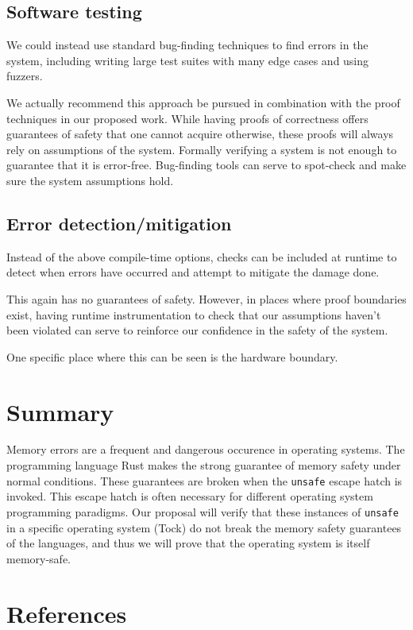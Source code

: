 \documentclass[12pt]{article}
\begin{document}
\subsection{Software testing}
We could instead use standard bug-finding techniques to find errors in the system, including writing large test suites with many edge cases and using fuzzers. 

We actually recommend this approach be pursued in combination with the proof techniques in our proposed work. While having proofs of correctness offers guarantees of safety that one cannot acquire otherwise, these proofs will always rely on assumptions of the system. Formally verifying a system is not enough to guarantee that it is error-free\cite{fonseca2017empirical}. Bug-finding tools can serve to spot-check and make sure the system assumptions hold.
    
\subsection{Error detection/mitigation}
Instead of the above compile-time options, checks can be included at runtime to detect when errors have occurred and attempt to mitigate the damage done. 

This again has no guarantees of safety. However, in places where proof boundaries exist, having runtime instrumentation to check that our assumptions haven't been violated can serve to reinforce our confidence in the safety of the system.

One specific place where this can be seen is the hardware boundary. %

\section{Summary}
Memory errors are a frequent and dangerous occurence in operating systems. The programming language Rust makes the strong guarantee of memory safety under normal conditions. These guarantees are broken when the \texttt{unsafe} escape hatch is invoked. This escape hatch is often necessary for different operating system programming paradigms. Our proposal will verify that these instances of \texttt{unsafe} in a specific operating system (Tock) do not break the memory safety guarantees of the languages, and thus we will prove that the operating system is itself memory-safe.

\newpage
\section{References}


\end{document}
